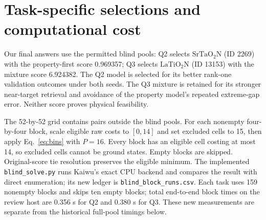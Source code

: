 \section{Task-specific selections and computational cost}
Our final answers use the permitted blind pools: Q2 selects $\mathrm{SrTaO_2N}$ (ID 2269) with the property-first score 0.969357; Q3 selects $\mathrm{LaTiO_2N}$ (ID 13153) with the mixture score 6.924382. The Q2 model is selected for its better rank-one validation outcomes under both seeds. The Q3 mixture is retained for its stronger near-target retrieval and avoidance of the property model's repeated extreme-gap error. Neither score proves physical feasibility.

The 52-by-52 grid contains pairs outside the blind pools. For each nonempty four-by-four block, scale eligible raw costs to $[0,14]$ and set excluded cells to 15, then apply Eq.~\eqref{eq:bins} with $P=16$. Every block has an eligible cell costing at most 14, so excluded cells cannot be ground states. Empty blocks are skipped. Original-score tie resolution preserves the eligible minimum. The implemented \texttt{blind\_solve.py} runs Kaiwu's exact CPU backend and compares the result with direct enumeration; its new ledger is \texttt{blind\_block\_runs.csv}. Each task uses 159 nonempty blocks and skips ten empty blocks; total end-to-end block times on the review host are 0.356 s for Q2 and 0.380 s for Q3. These new measurements are separate from the historical full-pool timings below.

